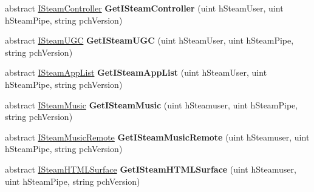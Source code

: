 \begin{DoxyCompactItemize}
\item 
\hypertarget{classValve_1_1Steamworks_1_1ISteamClient_a0013c58ffdf9e79b4d48c8660a951d46}{}abstract \hyperlink{classValve_1_1Steamworks_1_1ISteamController}{I\+Steam\+Controller} {\bfseries Get\+I\+Steam\+Controller} (uint h\+Steam\+User, uint h\+Steam\+Pipe, string pch\+Version)\label{classValve_1_1Steamworks_1_1ISteamClient_a0013c58ffdf9e79b4d48c8660a951d46}

\item 
\hypertarget{classValve_1_1Steamworks_1_1ISteamClient_ad5b1bddf7c83de151c4e8ec7f67c582f}{}abstract \hyperlink{classValve_1_1Steamworks_1_1ISteamUGC}{I\+Steam\+U\+G\+C} {\bfseries Get\+I\+Steam\+U\+G\+C} (uint h\+Steam\+User, uint h\+Steam\+Pipe, string pch\+Version)\label{classValve_1_1Steamworks_1_1ISteamClient_ad5b1bddf7c83de151c4e8ec7f67c582f}

\item 
\hypertarget{classValve_1_1Steamworks_1_1ISteamClient_ab2aa297a72ecdb731916318b89db2827}{}abstract \hyperlink{classValve_1_1Steamworks_1_1ISteamAppList}{I\+Steam\+App\+List} {\bfseries Get\+I\+Steam\+App\+List} (uint h\+Steam\+User, uint h\+Steam\+Pipe, string pch\+Version)\label{classValve_1_1Steamworks_1_1ISteamClient_ab2aa297a72ecdb731916318b89db2827}

\item 
\hypertarget{classValve_1_1Steamworks_1_1ISteamClient_a53e8d804fff94a3d7827c8965740346b}{}abstract \hyperlink{classValve_1_1Steamworks_1_1ISteamMusic}{I\+Steam\+Music} {\bfseries Get\+I\+Steam\+Music} (uint h\+Steamuser, uint h\+Steam\+Pipe, string pch\+Version)\label{classValve_1_1Steamworks_1_1ISteamClient_a53e8d804fff94a3d7827c8965740346b}

\item 
\hypertarget{classValve_1_1Steamworks_1_1ISteamClient_a8b6144b1890f43e2d71991127255c30d}{}abstract \hyperlink{classValve_1_1Steamworks_1_1ISteamMusicRemote}{I\+Steam\+Music\+Remote} {\bfseries Get\+I\+Steam\+Music\+Remote} (uint h\+Steamuser, uint h\+Steam\+Pipe, string pch\+Version)\label{classValve_1_1Steamworks_1_1ISteamClient_a8b6144b1890f43e2d71991127255c30d}

\item 
\hypertarget{classValve_1_1Steamworks_1_1ISteamClient_a8b6a5c868fa8c38d687869deed664062}{}abstract \hyperlink{classValve_1_1Steamworks_1_1ISteamHTMLSurface}{I\+Steam\+H\+T\+M\+L\+Surface} {\bfseries Get\+I\+Steam\+H\+T\+M\+L\+Surface} (uint h\+Steamuser, uint h\+Steam\+Pipe, string pch\+Version)\label{classValve_1_1Steamworks_1_1ISteamClient_a8b6a5c868fa8c38d687869deed664062}


\end{DoxyCompactItemize}
